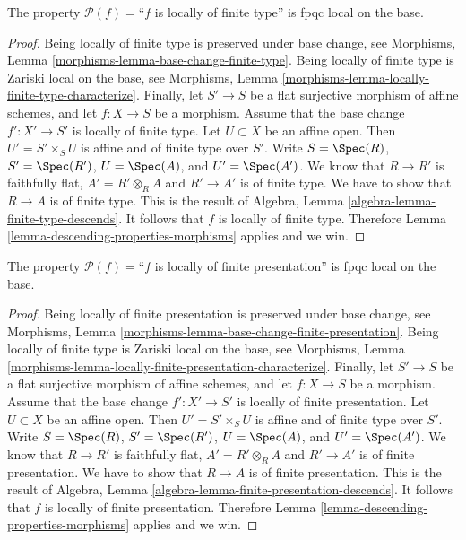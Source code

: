 \begin{lemma}
\label{lemma-descending-property-locally-finite-type}
The property $\mathcal{P}(f) =$``$f$ is locally of finite type''
is fpqc local on the base.
\end{lemma}

\begin{proof}
Being locally of finite type is preserved under base change, see
Morphisms, Lemma \ref{morphisms-lemma-base-change-finite-type}.
Being locally of finite type is Zariski local on the base, see
Morphisms, Lemma \ref{morphisms-lemma-locally-finite-type-characterize}.
Finally, let
$S' \to S$ be a flat surjective morphism of affine schemes,
and let $f : X \to S$ be a morphism. Assume that the base change
$f' : X' \to S'$ is locally of finite type.
Let $U \subset X$ be an affine open. Then $U' = S' \times_S U$
is affine and of finite type over $S'$. Write
$S = \Spec(R)$,
$S' = \Spec(R')$,
$U = \Spec(A)$, and
$U' = \Spec(A')$.
We know that $R \to R'$ is faithfully flat,
$A' = R' \otimes_R A$ and $R' \to A'$ is of finite type.
We have to show that $R \to A$ is of finite type.
This is the result of
Algebra, Lemma \ref{algebra-lemma-finite-type-descends}.
It follows that $f$ is locally of finite type.
Therefore Lemma \ref{lemma-descending-properties-morphisms} applies and we win.
\end{proof}

\begin{lemma}
\label{lemma-descending-property-locally-finite-presentation}
The property $\mathcal{P}(f) =$``$f$ is locally of finite presentation''
is fpqc local on the base.
\end{lemma}

\begin{proof}
Being locally of finite presentation is preserved under base change, see
Morphisms, Lemma \ref{morphisms-lemma-base-change-finite-presentation}.
Being locally of finite type is Zariski local on the base, see Morphisms,
Lemma \ref{morphisms-lemma-locally-finite-presentation-characterize}.
Finally, let
$S' \to S$ be a flat surjective morphism of affine schemes,
and let $f : X \to S$ be a morphism. Assume that the base change
$f' : X' \to S'$ is locally of finite presentation.
Let $U \subset X$ be an affine open. Then $U' = S' \times_S U$
is affine and of finite type over $S'$. Write
$S = \Spec(R)$,
$S' = \Spec(R')$,
$U = \Spec(A)$, and
$U' = \Spec(A')$.
We know that $R \to R'$ is faithfully flat,
$A' = R' \otimes_R A$ and $R' \to A'$ is of finite presentation.
We have to show that $R \to A$ is of finite presentation.
This is the result of
Algebra, Lemma \ref{algebra-lemma-finite-presentation-descends}.
It follows that $f$ is locally of finite presentation.
Therefore Lemma \ref{lemma-descending-properties-morphisms} applies and we win.
\end{proof}

